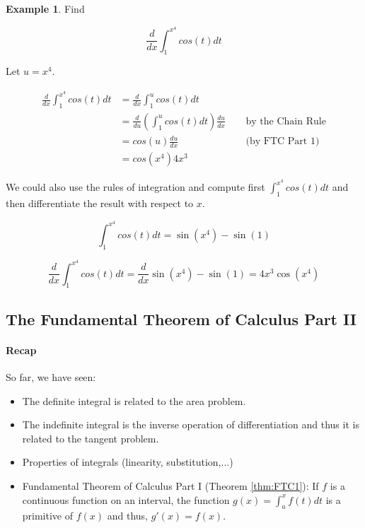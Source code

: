 \documentclass[a4paper,11pt]{article}
\theoremstyle{definition}
\newtheorem{example}{Example}
\theoremstyle{plain}
\begin{document}
    
\begin{example}
Find 

\[
\frac{d}{dx}\int^{x^4}_1 cos(t) dt
\]

Let \(u = x^4\). 

\begin{align}
	\frac{d}{dx}\int^{x^4}_1 cos(t) dt &= \frac{d}{dx}\int^{u}_1 cos(t) dt & \  & \\
	&= \frac{d}{du}\left(\int^{u}_1 cos(t) dt\right)\frac{du}{dx} & \  & \ \text{by the Chain Rule} \\
	&= cos(u)\frac{du}{dx} & \ & \ \text{(by FTC Part 1)} \\
	&= cos(x^4)4x^3
\end{align}

We could also use the rules of integration and compute first \(\displaystyle\int^{x^4}_1 cos(t) dt\) and then differentiate the result with respect to \(x\).

  \[
  \int^{x^4}_1 cos(t) dt = \sin{\left(x^{4} \right)} - \sin{\left(1 \right)}
  \]   

  \[
  \frac{d}{dx}\int^{x^4}_1 cos(t) dt = \frac{d}{dx} \sin(x^4)-\sin(1) =  4 x^{3} \cos{\left(x^{4} \right)}
  \]
\end{example}


\subsection{The Fundamental Theorem of Calculus Part II}\label{the-fundamental-theorem-of-calculus-part-ii}

\paragraph{Recap}\label{recap}

So far, we have seen: 

\begin{itemize}
	\item The definite integral is related to the area problem. 
	\item The indefinite integral is the inverse operation of differentiation and thus it is related to the tangent problem. 
	\item Properties of integrals (linearity, substitution,...) 
	\item Fundamental Theorem of Calculus Part I (Theorem \ref{thm:FTC1}): If \(f\) is a continuous function on an interval, the function \(g(x) = \int^x_a f(t) dt\) is a primitive of \(f(x)\) and thus, \(g'(x) = f(x)\).
\end{itemize}
\end{document}
